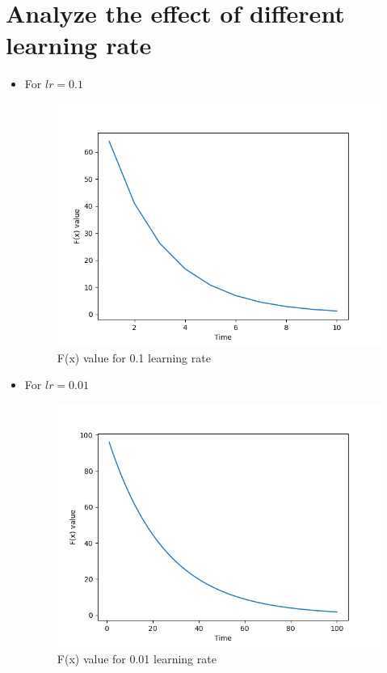 \documentclass[12pt]{article}
\begin{document}
\section{Analyze the effect of different learning rate}
\begin{itemize}
    \item For \(lr = 0.1\)
    
        \begin{figure}[h!]
            \centering
            \includegraphics[width=0.7\linewidth]{images/Lab1/LR01.png}
            \caption{F(x) value for 0.1 learning rate}
        \end{figure}
    \newpage
    \item For \(lr=0.01\)
        \begin{figure}[h!]
            \centering
            \includegraphics[width=0.7\linewidth]{images/Lab1/LR001.png}
            \caption{F(x) value for 0.01 learning rate}
        \end{figure}


\end{itemize}
\end{document}
